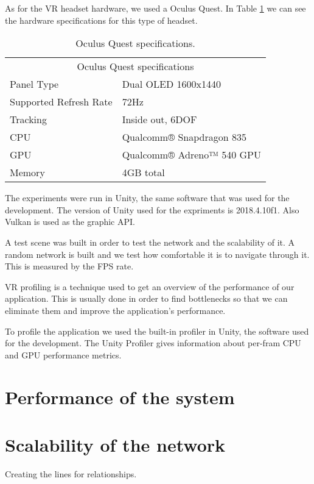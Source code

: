 As for the VR headset hardware, we used a Oculus Quest. In Table \ref{tab:oculus-specs} we can see the hardware specifications for this type of headset.

\begin{table}[h!]
\centering
\begin{tabular}{ll}
\multicolumn{2}{c}{Oculus Quest specifications} \\
Panel Type   & Dual OLED 1600x1440 \\
Supported Refresh Rate  &  72Hz \\
Tracking & Inside out, 6DOF \\
CPU & Qualcomm® Snapdragon 835 \\
GPU & Qualcomm® Adreno™ 540 GPU \\
Memory & 4GB total
\end{tabular}
\caption{Oculus Quest specifications.}
\label{tab:oculus-specs}
\end{table}

The experiments were run in Unity, the same software that was used for the development. The version of Unity used for the expriments is 2018.4.10f1. Also Vulkan is used as the graphic API.

A test scene was built in order to test the network and the scalability of it. A random network is built and we test how comfortable it is to navigate through it. This is measured by the FPS rate.

VR profiling is a technique used to get an overview of the performance of our application. This is usually done in order to find bottlenecks so that we can eliminate them and improve the application's performance.

To profile the application we used the built-in profiler in Unity, the software used for the development. The Unity Profiler gives information about per-fram CPU and GPU performance metrics.

\section{Performance of the system}

\section{Scalability of the network}
Creating the lines for relationships.

